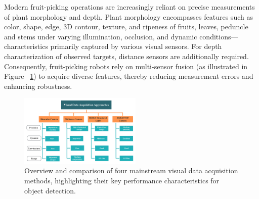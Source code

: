 \documentclass{ieeeaccess}
\begin{document}
Modern fruit-picking operations are increasingly reliant on precise measurements of plant morphology and depth. Plant morphology encompasses features such as color, shape, edge, 	3D contour, texture, and ripeness of fruits, leaves, peduncle and stems under varying illumination, occlusion, and dynamic conditions—characteristics primarily captured by various visual sensors. For depth characterization of observed targets, distance sensors are additionally required. 
Consequently, fruit-picking robots rely on multi-sensor fusion (as illustrated in Figure ~\ref{fig:camera}) to acquire diverse features, thereby reducing measurement errors and enhancing robustness.
\begin{figure}[hbtp]
\centering
\includegraphics[width=0.52\textwidth]{fig_camera1.png}
\caption{Overview and comparison of four mainstream visual data acquisition methods, highlighting their key performance characteristics for object detection.}
\label{fig:camera}
\end{figure}
\end{document}
